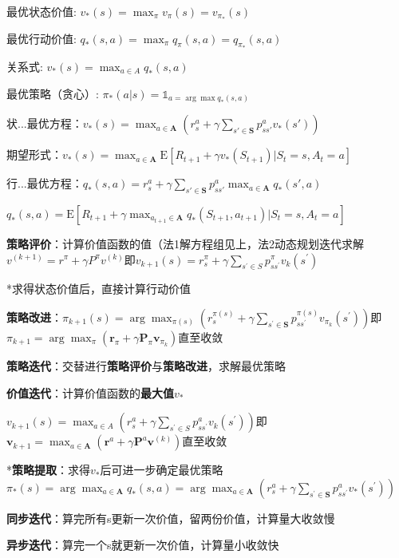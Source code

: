 	
	
	最优状态价值: $v_{*}(s)=\max_{\pi} v_{\pi}(s)=v_{\pi_{*}}(s)$
	
	最优行动价值: $q_{*}(s,a)=\max_{\pi} q_{\pi}(s,a)=q_{\pi_{*}}(s,a)$
	
	关系式: $v_{*}(s)=\max_{a\in A}q_{*}(s,a)$
	
	最优策略（贪心）: $\pi_{*}(a|s)=\mathbb{1}_{a=\arg\max q_{*}(s,a)}$
	
	状...最优方程：$v_*(s)=\max_{a\in\mathbf{A}}\left(r_s^a+\gamma\sum_{s'\in\mathbf{S}}p_{ss'}^av_*(s')\right)$
	
	期望形式：$v_*(s)=\max_{a\in\mathbf{A}}\mathrm{E}[R_{t + 1}+\gamma v_*(S_{t + 1})|S_t = s,A_t = a]$
	
	行...最优方程：$q_*(s,a)=r_s^a+\gamma\sum_{s'\in\mathbf{S}}p_{ss'}^a\max_{a\in\mathbf{A}}q_*(s',a)$
	
	$q_*(s,a)=\mathrm{E}[R_{t + 1}+\gamma\max_{a_{t + 1}\in\mathbf{A}}q_*(S_{t + 1},a_{t + 1})|S_t = s,A_t = a]$
	
	\textbf{策略评价}：计算价值函数的值（法1解方程组见上，法2动态规划迭代求解$v^{(k+1)}=r^{\pi}+\gamma P^{\pi} v^{(k)}$即$v_{k+1}(s)=r_{s}^{\pi}+\gamma\sum_{s^{\prime}\in S}p_{ss^{\prime}}^{\pi} v_{k}(s^{\prime})$
	
	*求得状态价值后，直接计算行动价值
	
	\textbf{策略改进}：$\pi_{k+1}(s)=\arg\max_{\pi(s)}\left(r_{s}^{\pi(s)}+\gamma\sum_{s^{\prime}\in\mathbf{S}}p_{ss^{\prime}}^{\pi(s)}v_{\pi_{k}}\left(s^{\prime}\right)\right)$即$\pi_{k+1}=\arg\max_{\pi}\left(\mathbf{r}_{\pi}+\gamma\mathbf{P}_{\pi}\mathbf{v}_{\pi_{k}}\right)$直至收敛
	
	\textbf{策略迭代}：交替进行\textbf{策略评价}与\textbf{策略改进}，求解最优策略
	
	\textbf{价值迭代}：计算价值函数的\textbf{最大值}$v_*$
	
	$v_{k+1}(s)=\max_{a\in A}\left(r_{s}^a+\gamma\sum_{s^{\prime}\in S}p_{ss^{\prime}}^av_{k}(s^{\prime})\right)$即$\mathbf{v}_{k+1}=\max_{a \in \mathbf{A}}\left(\mathbf{r}^a+\gamma\mathbf{P}^a\mathbf{v}^{(k)}\right)$直至收敛
	
	*\textbf{策略提取}：求得$v_*$后可进一步确定最优策略$\pi_{*}(s)=\arg\max_{a\in\mathbf{A}} q_{*}(s,a)=\arg\max_{a\in\mathbf{A}}\left(r_{s}^{a}+\gamma\sum_{s^{\prime}\in\mathbf{S}} p_{ss^{\prime}}^{a} v_{*}\left(s^{\prime}\right)\right)$
	
	\textbf{同步迭代}：算完所有s更新一次价值，留两份价值，计算量大收敛慢
	
	\textbf{异步迭代}：算完一个s就更新一次价值，计算量小收敛快
	
